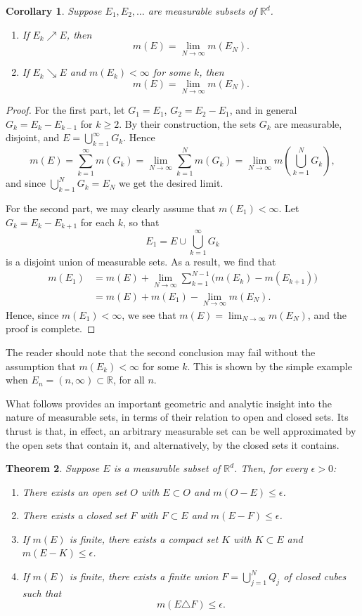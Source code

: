\documentclass[11pt,openany]{book}
\newtheorem{theorem}{Theorem}[section]
\newtheorem{corollary}[theorem]{Corollary}
\begin{document}
\begin{corollary}
Suppose $E_1,E_2,\ldots$ are measurable subsets of $\mathbb{R}^d$.
\begin{enumerate}
\item[(i)] If $E_k\nearrow E$, then
\[
 m(E)=\lim_{N\to\infty}m(E_N).
\]
\item[(ii)] If $E_k\searrow E$ and $m(E_k)<\infty$ for some $k$, then
\[
 m(E)=\lim_{N\to\infty}m(E_N).
\]
\end{enumerate}
\end{corollary}

\begin{proof}
For the first part, let $G_1=E_1$, $G_2=E_2-E_1$, and in general $G_k=E_k-E_{k-1}$ for $k\ge2$. By their construction, the sets $G_k$ are measurable, disjoint, and $E=\bigcup_{k=1}^{\infty}G_k$. Hence
\[
 m(E)=\sum_{k=1}^{\infty}m(G_k)
 =\lim_{N\to\infty}\sum_{k=1}^N m(G_k)
 =\lim_{N\to\infty}m\left(\bigcup_{k=1}^N G_k\right),
\]
and since $\bigcup_{k=1}^N G_k=E_N$ we get the desired limit.

For the second part, we may clearly assume that $m(E_1)<\infty$. Let $G_k=E_k-E_{k+1}$ for each $k$, so that
\[
 E_1=E\cup\bigcup_{k=1}^{\infty}G_k
\]
is a disjoint union of measurable sets. As a result, we find that
\[
\begin{aligned}
 m(E_1)
 &=m(E)+\lim_{N\to\infty}\sum_{k=1}^{N-1}\bigl(m(E_k)-m(E_{k+1})\bigr)\\
 &=m(E)+m(E_1)-\lim_{N\to\infty}m(E_N).
\end{aligned}
\]
Hence, since $m(E_1)<\infty$, we see that $m(E)=\lim_{N\to\infty}m(E_N)$, and the proof is complete.
\end{proof}

The reader should note that the second conclusion may fail without the assumption that $m(E_k)<\infty$ for some $k$. This is shown by the simple example when $E_n=(n,\infty)\subset\mathbb{R}$, for all $n$.

What follows provides an important geometric and analytic insight into the nature of measurable sets, in terms of their relation to open and closed sets. Its thrust is that, in effect, an arbitrary measurable set can be well approximated by the open sets that contain it, and alternatively, by the closed sets it contains.

\begin{theorem}
Suppose $E$ is a measurable subset of $\mathbb{R}^d$. Then, for every $\epsilon>0$:
\begin{enumerate}
\item[(i)] There exists an open set $O$ with $E\subset O$ and $m(O-E)\le\epsilon$.
\item[(ii)] There exists a closed set $F$ with $F\subset E$ and $m(E-F)\le\epsilon$.
\item[(iii)] If $m(E)$ is finite, there exists a compact set $K$ with $K\subset E$ and $m(E-K)\le\epsilon$.
\item[(iv)] If $m(E)$ is finite, there exists a finite union $F=\bigcup_{j=1}^NQ_j$ of closed cubes such that
\[
 m(E\triangle F)\le\epsilon.
\]
\end{enumerate}
\end{theorem}
\end{document}
